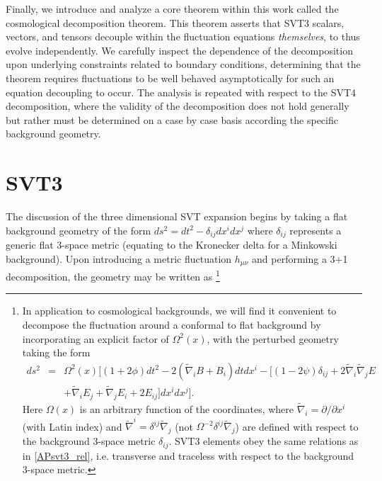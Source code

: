 Finally, we introduce and analyze a core theorem within this work called the cosmological decomposition theorem. This theorem asserts that SVT3 scalars, vectors, and tensors decouple within the fluctuation equations \emph{themselves}, to thus evolve independently. We carefully inspect the dependence of the decomposition upon underlying constraints related to boundary conditions, determining that the theorem requires fluctuations to be well behaved asymptotically for such an equation decoupling to occur. The analysis is repeated with respect to the SVT4 decomposition, where the validity of the decomposition does not hold generally but rather must be determined on a case by case basis according the specific background geometry.
\section{SVT3}
\label{s:svt3}
%
The discussion of the three dimensional SVT expansion begins by taking a flat background geometry of the form $ds^2=dt^2-\delta_{ij}dx^idx^j$ where $\delta_{ij}$ represents a generic flat 3-space metric (equating to the Kronecker delta for a Minkowski background). Upon introducing a metric fluctuation $h_{\mu\nu}$ and performing a 3+1 decomposition, the geometry may be written as
%
	\footnote{In application to cosmological backgrounds, we will find it convenient to decompose the fluctuation around a conformal to flat background by incorporating an explicit factor of $\Omega^2(x)$, with the perturbed geometry taking the form
	\begin{eqnarray}
	ds^2 &=& \Omega^2(x) \bigg[ (1+2\phi) dt^2 -2(\tilde{\nabla}_i B +B_i)dt dx^i - [(1-2\psi)\delta_{ij} +2\tilde{\nabla}_i\tilde{\nabla}_j E
	\nonumber\\
	&& + \tilde{\nabla}_i E_j + \tilde{\nabla}_j E_i + 2E_{ij}]dx^i dx^j\bigg].
	\label{AP62}
	\end{eqnarray}
	Here $\Omega(x)$ is an arbitrary function of the coordinates, where $\tilde{\nabla}_i=\partial/\partial x^i$ (with Latin index) and  $\tilde{\nabla}^i=\delta^{ij}\tilde{\nabla}_j$ (not $\Omega^{-2}\delta^{ij}\tilde{\nabla}_j$) are defined with respect to the background 3-space metric $\delta_{ij}$. SVT3 elements obey the same relations as in \eqref{APsvt3_rel}, i.e. transverse and traceless with respect to the background 3-space metric.}
%

